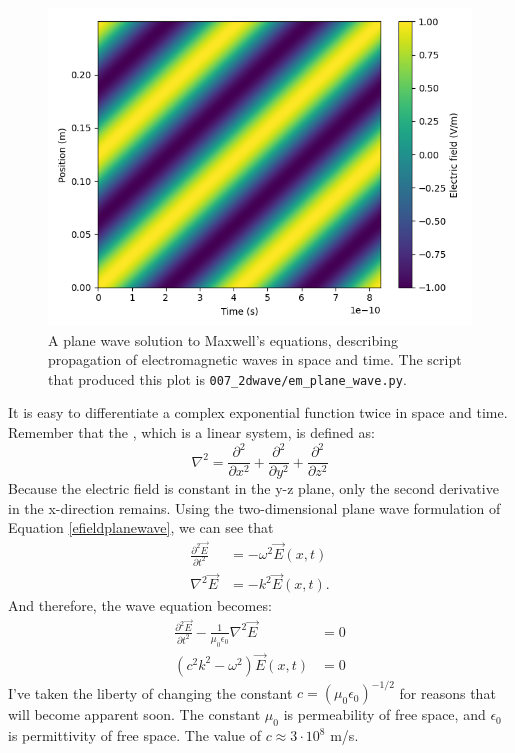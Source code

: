 \begin{figure}
  \begin{center}
    \includegraphics[width=\textwidth]{code/007_2dwave/em_plane_wave.png}
  \end{center}
  \caption{A plane wave solution to Maxwell's equations, describing propagation of
    electromagnetic waves in space and time. The script that produced this
    plot is \texttt{007\_2dwave/em\_plane\_wave.py}. }
  \label{fig:planewave}
\end{figure}

It is easy to differentiate a complex exponential function twice in space and time.
Remember that the , which is a linear system, is defined as:
\begin{equation}
  \nabla^2 = \frac{\partial^2}{\partial x^2} + \frac{\partial^2}{\partial y^2} +\frac{\partial^2}{\partial z^2}
\end{equation}
Because the electric field is constant in the y-z plane, only the second derivative in
the x-direction remains. Using the two-dimensional plane wave formulation of Equation \ref{efieldplanewave}, we can see that
\begin{align}
  \frac{\partial ^2 \vec{E}}{\partial t^2} & = -\omega^2 \vec{E}(x,t) \\
  \nabla^2 \vec{E}                         & = -k^2 \vec{E}(x,t).
\end{align}
And therefore, the wave equation becomes:
\begin{align}
  \frac{\partial^2 \vec{E}}{\partial t^2} - \frac{1}{\mu_0 \epsilon_0} \nabla^2 \vec{E} & = 0                          \\
  (c^2k^2-\omega^2) \vec{E}(x,t)                                                        & = 0 \label{eq:disp_relation}
\end{align}
I've taken the liberty of changing the constant $c = (\mu_0\epsilon_0)^{-1/2}$ for
reasons that will become apparent soon.
The constant $\mu_0$ is permeability of free space, and $\epsilon_0$ is permittivity of free space.
The value of $c \approx 3\cdot 10^{8}$ m/s.

